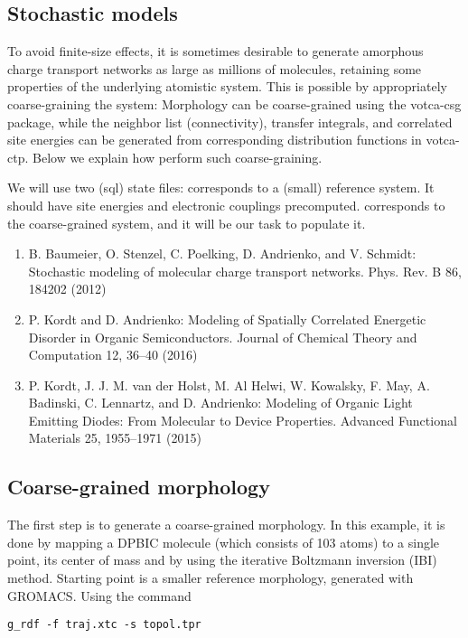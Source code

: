 \subsection{Stochastic models}
\label{sec:stochastic}

To avoid finite-size effects, it is sometimes desirable to generate amorphous charge transport networks as large as millions of molecules, retaining some properties of the underlying atomistic system. This is possible by appropriately coarse-graining the system: Morphology can be coarse-grained using the votca-csg package, while the neighbor list (connectivity), transfer integrals, and correlated site energies can be generated from corresponding distribution functions in votca-ctp. Below we explain how perform such coarse-graining.

We will use two (sql) state files: \sqlstateref corresponds to a (small) reference system. It should have site energies and electronic couplings precomputed. \sqlstatecg corresponds to the coarse-grained system, and it will be our task to populate it.

\begin{enumerate}
\item{B. Baumeier, O. Stenzel, C. Poelking, D. Andrienko, and V. Schmidt: Stochastic modeling of molecular charge transport networks. Phys. Rev. B 86, 184202 (2012)}
\item{P. Kordt and D. Andrienko: Modeling of Spatially Correlated Energetic Disorder in Organic Semiconductors. Journal of Chemical Theory and Computation 12, 36--40 (2016)}
\item{P. Kordt, J. J. M. van der Holst, M. Al Helwi, W. Kowalsky, F. May, A. Badinski, C. Lennartz, and D. Andrienko: Modeling of Organic Light Emitting Diodes: From Molecular to Device Properties. Advanced Functional Materials 25, 1955--1971 (2015)}
\end{enumerate}


\subsection{Coarse-grained morphology}
The first step is to generate a coarse-grained morphology. In this example, it is done by mapping a DPBIC molecule (which consists of 103 atoms) to a single point, its center of mass and by using the iterative Boltzmann inversion (IBI) method. Starting point is a smaller reference morphology, generated with GROMACS. Using the command

\texttt{g\_rdf -f traj.xtc -s topol.tpr}

